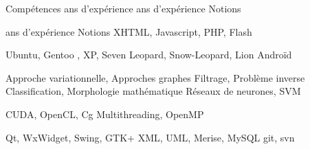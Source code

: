 \vspace{-.5cm}
\begin{rubric}{Compétences}
   ans d'expérience
   ans d'expérience
   Notions
  
   ans d'expérience
   Notions
   XHTML, Javascript, PHP, Flash
  
  \entry*[Linux] Ubuntu, Gentoo
  , XP, Seven 
  \entry*[Apple] Leopard, Snow-Leopard, Lion
  \entry*[Mobile] Androïd
  
  \entry*[Modélisation] Approche variationnelle, Approches graphes
  \entry*[Restauration] Filtrage, Problème inverse
  \entry*[Segmentation] Classification, Morphologie mathématique
  \entry*[Apprentissage] Réseaux de neurones, SVM
  
   CUDA, OpenCL, Cg
   Multithreading, OpenMP
  
  \entry*[IHM] Qt, WxWidget, Swing, GTK+
   XML, UML, Merise, MySQL
  \entry*[Versionning] git, svn
  \end{rubric}

